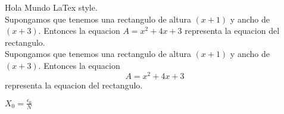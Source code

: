 \documentclass[11pt]{article}
\begin{document}
Hola Mundo LaTex style.\\
Supongamos que tenemos una rectangulo de altura $(x+1)$ y ancho de $(x+3)$. Entonces la equacion $A=x^2+4x+3$ representa la equacion del rectangulo.\\

Supongamos que tenemos una rectangulo de altura $(x+1)$ y ancho de $(x+3)$. Entonces la equacion $$A=x^2+4x+3$$ representa la equacion del rectangulo.

$X_0=\frac{\epsilon _0}{N}$
\end{document}
